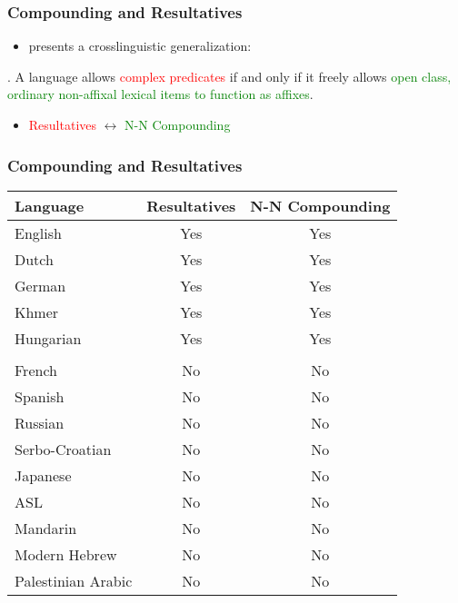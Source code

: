 \documentclass[Proposal]{subfiles}
\begin{document}
\begin{frame}
  \frametitle{Compounding and Resultatives}
  \begin{itemize}
    \item \textcite{snyder1995language} presents a crosslinguistic generalization:
  \end{itemize}
  \ex. A language allows \textcolor<2>{red}{complex predicates} if and only if it freely allows \textcolor<2>{green}{open class, ordinary non-affixal lexical items to function as affixes}. \parencite[35]{snyder1995language}

  \begin{itemize}
    \item<2> \textcolor{red}{Resultatives} $\leftrightarrow$ \textcolor{green}{N-N Compounding}
  \end{itemize}
\end{frame}
\begin{frame}
  \frametitle{Compounding and Resultatives}
  \begin{center}
  {\small
  \begin{tabular}[t]{lcc}
    \textbf{Language} & \textbf{Resultatives} & \textbf{N-N Compounding}\\
    \hline
    English & Yes & Yes\\
    Dutch & Yes & Yes\\
    German & Yes & Yes\\
    Khmer & Yes & Yes\\
    Hungarian & Yes & Yes\\
    & & \\
    French & No & No\\
    Spanish & No & No\\
    Russian & No & No\\
    Serbo-Croatian & No & No\\
    Japanese & No & No\\
    ASL & No & No\\
    Mandarin & No & No\\
    Modern Hebrew & No & No\\
    Palestinian Arabic & No & No\\
  \end{tabular}}
\end{center}
\end{frame}
\end{document}
